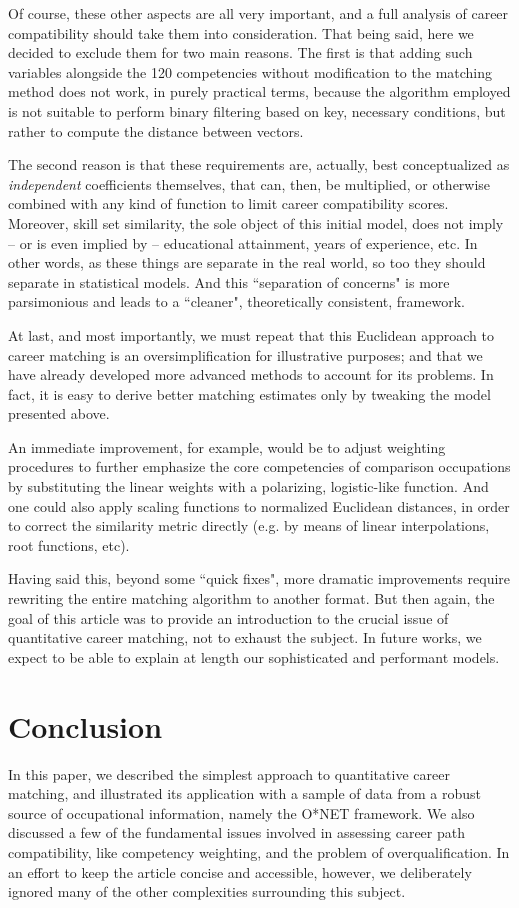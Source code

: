 \documentclass{article}
\begin{document}
Of course, these other aspects are all very important, and a full analysis of
career compatibility should take them into consideration. That being said, here
we decided to exclude them for two main reasons. The first is that adding such
variables alongside the 120 competencies without modification to the matching
method does not work, in purely practical terms, because the algorithm employed
is not suitable to perform binary filtering based on key, necessary conditions,
but rather to compute the distance between vectors.

The second reason is that these requirements are, actually, best conceptualized
as \textit{independent} coefficients themselves, that can, then, be multiplied,
or otherwise combined with any kind of function to limit career compatibility
scores. Moreover, skill set similarity, the sole object of this initial model,
does not imply -- or is even implied by -- educational attainment, years of
experience, etc. In other words, as these things are separate in the real
world, so too they should separate in statistical models. And this ``separation
of concerns" is more parsimonious and leads to a ``cleaner", theoretically
consistent, framework.

At last, and most importantly, we must repeat that this Euclidean approach to
career matching is an oversimplification for illustrative purposes; and that we
have already developed more advanced methods to account for its problems. In
fact, it is easy to derive better matching estimates only by tweaking the model
presented above.

An immediate improvement, for example, would be to adjust weighting procedures
to further emphasize the core competencies of comparison occupations by
substituting the linear weights with a polarizing, logistic-like function. And
one could also apply scaling functions to normalized Euclidean distances, in
order to correct the similarity metric directly (e.g. by means of linear
interpolations, root functions, etc).

Having said this, beyond some ``quick fixes", more dramatic improvements
require rewriting the entire matching algorithm to another format. But then
again, the goal of this article was to provide an introduction to the crucial
issue of quantitative career matching, not to exhaust the subject. In future
works, we expect to be able to explain at length our sophisticated and
performant models.

\section{Conclusion}
In this paper, we described the simplest approach to quantitative career
matching, and illustrated its application with a sample of data from a robust
source of occupational information, namely the O*NET framework. We also
discussed a few of the fundamental issues involved in assessing career path
compatibility, like competency weighting, and the problem of overqualification.
In an effort to keep the article concise and accessible, however, we
deliberately ignored many of the other complexities surrounding this subject.
\end{document}
